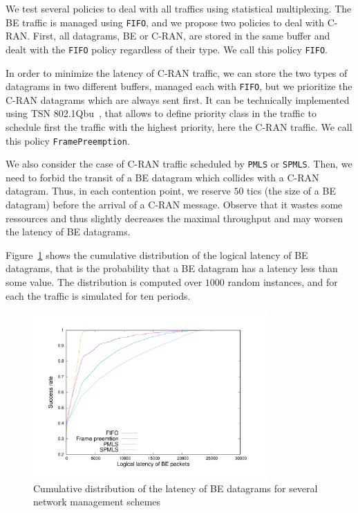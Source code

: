 \documentclass[a4paper,10pt]{journal}
\newcommand\PMLS{\texttt{PMLS}\xspace}
\newcommand\SPMLS{\texttt{SPMLS}\xspace}
\newcommand\FIFO{\texttt{FIFO}\xspace}
\newcommand\framepre{\texttt{FramePreemption}\xspace}
\begin{document}
   We test several policies to deal with all traffics using statistical multiplexing.
   	The BE traffic is managed using \FIFO, and we propose two policies to deal with C-RAN. First, all datagrams, BE or C-RAN, are stored in the same buffer and dealt with the \FIFO policy regardless of their type. We call this policy \FIFO.

    In order to minimize the latency of C-RAN traffic, we can store the two types of datagrams in two different buffers, managed each with \FIFO, but we prioritize the C-RAN datagrams which are always sent first. It can be technically implemented using TSN 802.1Qbu~\cite{ieee802}, that allows to define priority class in the traffic to schedule first the traffic with the highest priority, here the C-RAN traffic. We call this policy \framepre.
   
   We also consider the case of C-RAN traffic scheduled by \PMLS or \SPMLS. Then, we need to forbid the transit of a BE datagram which collides with a C-RAN datagram. Thus, in each contention point, we reserve $50$ tics (the size of a BE datagram) before the arrival of a C-RAN message. Observe that it wastes some ressources and thus slightly decreases the maximal throughput and may worsen the latency of BE datagrams.
    
    Figure~\ref{fig:belatency} shows the cumulative distribution of the logical latency of BE datagrams, that is the probability that a BE datagram has a latency less than some value.
    The distribution is computed over $1000$ random instances, and for each the traffic is simulated for ten periods.

     \begin{figure}
       \begin{center}
      \includegraphics[width = 0.8\textwidth]{res.pdf}
      \end{center}
      \caption{Cumulative distribution of the latency of BE datagrams for several network management schemes}
      \label{fig:belatency}   
     \end{figure}    
     
\end{document}

